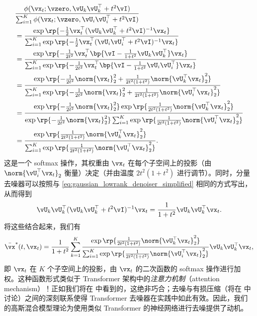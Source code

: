 \documentclass[../../book-main_zh.tex]{subfiles}
\begin{document}
\begin{align}
    &\frac{\phi(\vx_{t} ; \vzero, \vU_{k}\vU_{k}^{\top} + t^{2}\vI)}{\sum_{i
    = 1}^{K}\phi(\vx_{t} ; \vzero, \vU_{i}\vU_{i}^{\top} + t^{2}\vI)} \\
    &= \frac{\exp\rp{-\frac{1}{2}\vx_{t}^{\top}(\vU_{k}\vU_{k}^{\top}
    + t^{2}\vI)^{-1}\vx_{t}}}{\sum_{i =
        1}^{K}\exp\rp{-\frac{1}{2}\vx_{t}^{\top}(\vU_{i}\vU_{i}^{\top} +
    t^{2}\vI)^{-1}\vx_{t}}} \\
    &= \frac{\exp\rp{-\frac{1}{2t^{2}}\vx_{t}^{\top}\bp{\vI -
    \frac{1}{1 + t^{2}}\vU_{k}\vU_{k}^{\top}}\vx_{t}}}{\sum_{i =
        1}^{K}\exp\rp{-\frac{1}{2t^{2}}\vx_{t}^{\top}\bp{\vI - \frac{1}{1
    + t^{2}}\vU_{i}\vU_{i}^{\top}}\vx_{t}}} \\
    &= \frac{\exp\rp{-\frac{1}{2t^{2}}\norm{\vx_{t}}_{2}^{2} +
            \frac{1}{2t^{2}(1 +
    t^{2})}\norm{\vU_{k}^{\top}\vx_{t}}_{2}^{2}}}{\sum_{i =
        1}^{K}\exp\rp{-\frac{1}{2t^{2}}\norm{\vx_{t}}_{2}^{2} +
    \frac{1}{2t^{2}(1 + t^{2})}\norm{\vU_{i}^{\top}\vx_{t}}_{2}^{2}}} \\
    &=
    \frac{\exp\rp{-\frac{1}{2t^{2}}\norm{\vx_{t}}_{2}^{2}}\exp\rp{\frac{1}{2t^{2}(1
                    +
    t^{2})}\norm{\vU_{k}^{\top}\vx_{t}}_{2}^{2}}}{\exp\rp{-\frac{1}{2t^{2}}\norm{\vx_{t}}_{2}^{2}}\sum_{i
        = 1}^{K}\exp\rp{\frac{1}{2t^{2}(1 +
    t^{2})}\norm{\vU_{i}^{\top}\vx_{t}}_{2}^{2}}} \\
    &= \frac{\exp\rp{\frac{1}{2t^{2}(1 +
    t^{2})}\norm{\vU_{k}^{\top}\vx_{t}}_{2}^{2}}}{\sum_{i =
        1}^{K}\exp\rp{\frac{1}{2t^{2}(1 +
    t^{2})}\norm{\vU_{i}^{\top}\vx_{t}}_{2}^{2}}}.
\end{align}
这是一个 softmax 操作，其权重由 \(\vx_{t}\) 在每个子空间上的投影（由 \(\norm{\vU_{i}^{\top}\vx_{t}}_{2}\) 衡量）决定（并由温度 \(2t^{2}(1 + t^{2})\) 进行调节）。同时，分量去噪器可以按照与 \eqref{eq:gaussian_lowrank_denoiser_simplified} 相同的方式写出，从而得到
\begin{equation}
    \vU_{k}\vU_{k}^{\top}(\vU_{k}\vU_{k}^{\top} +
    t^{2}\vI)^{-1}\vx_{t} = \frac{1}{1 + t^{2}}\vU_{k}\vU_{k}^{\top}\vx_{t}.
\end{equation}
将这些结合起来，我们有
\begin{equation}\label{eq:gmm_lowrank_denoiser}
    \bar{\vx}^{\ast}(t, \vx_{t}) = \frac{1}{1 + t^{2}}\sum_{k =
    1}^{K}\frac{\exp\rp{\frac{1}{2t^{2}(1 +
    t^{2})}\norm{\vU_{k}^{\top}\vx_{t}}_{2}^{2}}}{\sum_{i =
        1}^{K}\exp\rp{\frac{1}{2t^{2}(1 +
    t^{2})}\norm{\vU_{i}^{\top}\vx_{t}}_{2}^{2}}}\vU_{k}\vU_{k}^{\top}\vx_{t},
\end{equation}
即 \(\vx_{t}\) 在 \(K\) 个子空间上的投影，由 \(\vx_{t}\) 的二次函数的 softmax 操作进行加权。这种函数形式类似于 Transformer 架构中的\textit{注意力机制}（attention mechanism）！正如我们将在  中看到的，这绝非巧合；去噪与有损压缩（将在  中讨论）之间的深刻联系使得 Transformer 去噪器在实践中如此有效。因此，我们的高斯混合模型理论为使用类似 Transformer 的神经网络进行去噪提供了动机。
\end{document}

